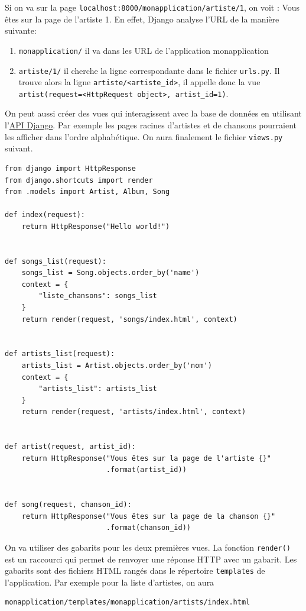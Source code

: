 \documentclass[a4paper, 10pt]{article}
\begin{document}
Si on va sur la page \texttt{localhost:8000/monapplication/artiste/1}, on voit : \og Vous êtes sur la page de l'artiste 1\fg{}. En effet, Django analyse l'URL de la manière suivante:
\begin{enumerate}
    \item \texttt{monapplication/} il va dans les URL de l’application monapplication
    \item \texttt{artiste/1/} il cherche la ligne correspondante dans le fichier \texttt{urls.py}. Il trouve alors la ligne \texttt{artiste/<artiste_id>}, il appelle donc la vue \texttt{artist(request=<HttpRequest object>, artist_id=1)}.
\end{enumerate}

On peut aussi créer des vues qui interagissent avec la base de données en utilisant l'\href{https://docs.djangoproject.com/fr/2.2/topics/db/queries/}{API Django}. Par exemple les pages racines d'artistes et de chansons pourraient les afficher dans l'ordre alphabétique. On aura finalement le fichier \texttt{views.py} suivant.

\begin{verbatim}
from django import HttpResponse
from django.shortcuts import render
from .models import Artist, Album, Song

def index(request):
    return HttpResponse("Hello world!")


def songs_list(request):
    songs_list = Song.objects.order_by('name')
    context = {
        "liste_chansons": songs_list
    }
    return render(request, 'songs/index.html', context)


def artists_list(request):
    artists_list = Artist.objects.order_by('nom')
    context = {
        "artists_list": artists_list
    }
    return render(request, 'artists/index.html', context)


def artist(request, artist_id):
    return HttpResponse("Vous êtes sur la page de l'artiste {}"
                        .format(artist_id))


def song(request, chanson_id):
    return HttpResponse("Vous êtes sur la page de la chanson {}"
                        .format(chanson_id))

\end{verbatim}

On va utiliser des gabarits pour les deux premières vues. La fonction \texttt{render()} est un raccourci qui permet de renvoyer une réponse HTTP avec un gabarit. Les gabarits sont des fichiers HTML rangés dans le répertoire \texttt{templates} de l'application. Par exemple pour la liste d'artistes, on aura
\begin{verbatim}
monapplication/templates/monapplication/artists/index.html
\end{verbatim}
\end{document}
